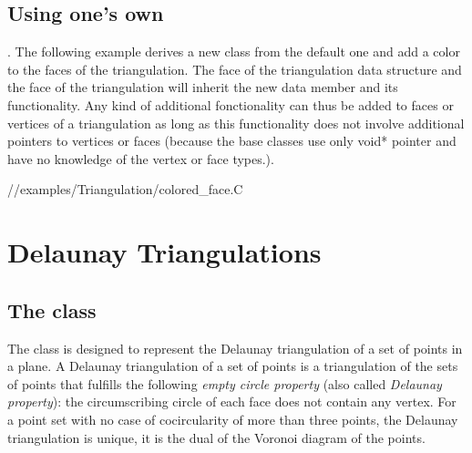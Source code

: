 \subsection{Using one's own }.
The following example derives a new  class from the default
one and add a color to the faces of the triangulation. 
The face of the triangulation data structure
and the face of the triangulation will inherit the new data member 
and its functionality.
Any kind of additional fonctionality can thus be added to faces or vertices of a triangulation 
as long as this functionality  does not involve additional pointers to vertices or faces
(because the base classes use only void* pointer and have no knowledge
of the vertex or face types.).

\ccExample
//examples/Triangulation/colored\_face.C



\section{Delaunay Triangulations}
\label{I1_Sect_Delaunay}


\subsection{The class \protect {}}
The class  is designed to represent
the Delaunay triangulation of a set of points in a plane.
A  Delaunay triangulation of a set of points
is a triangulation of the sets of points that fulfills
the following {\em empty circle property} 
(also called {\em Delaunay property}): the circumscribing
circle of each
 face does not contain any vertex.
For a point set with no case of cocircularity 
of more than three points,
the Delaunay triangulation is unique, it is  the dual
of the Voronoi diagram of the points.


